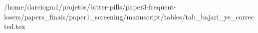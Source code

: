 /home/darciogm1/projetos/bitter-pills/paper3-frequent-losers/papers_finais/paper1_screening/manuscript/tables/tab_bajari_ye_corrected.tex
